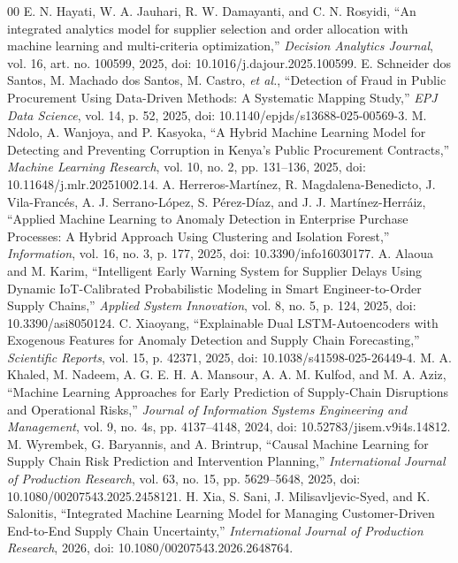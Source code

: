 \documentclass[conference]{IEEEtran}
\begin{document}
\begin{thebibliography}{00}
 E. N. Hayati, W. A. Jauhari, R. W. Damayanti, and C. N. Rosyidi, ``An integrated analytics model for supplier selection and order allocation with machine learning and multi-criteria optimization,'' \textit{Decision Analytics Journal}, vol. 16, art. no. 100599, 2025, doi: 10.1016/j.dajour.2025.100599.
 E. Schneider dos Santos, M. Machado dos Santos, M. Castro, \textit{et al.}, ``Detection of Fraud in Public Procurement Using Data-Driven Methods: A Systematic Mapping Study,'' \textit{EPJ Data Science}, vol. 14, p. 52, 2025, doi: 10.1140/epjds/s13688-025-00569-3.
 M. Ndolo, A. Wanjoya, and P. Kasyoka, ``A Hybrid Machine Learning Model for Detecting and Preventing Corruption in Kenya's Public Procurement Contracts,'' \textit{Machine Learning Research}, vol. 10, no. 2, pp. 131--136, 2025, doi: 10.11648/j.mlr.20251002.14.
 A. Herreros-Mart\'inez, R. Magdalena-Benedicto, J. Vila-Franc\'es, A. J. Serrano-L\'opez, S. P\'erez-D\'iaz, and J. J. Mart\'inez-Herr\'aiz, ``Applied Machine Learning to Anomaly Detection in Enterprise Purchase Processes: A Hybrid Approach Using Clustering and Isolation Forest,'' \textit{Information}, vol. 16, no. 3, p. 177, 2025, doi: 10.3390/info16030177.
 A. Alaoua and M. Karim, ``Intelligent Early Warning System for Supplier Delays Using Dynamic IoT-Calibrated Probabilistic Modeling in Smart Engineer-to-Order Supply Chains,'' \textit{Applied System Innovation}, vol. 8, no. 5, p. 124, 2025, doi: 10.3390/asi8050124.
 C. Xiaoyang, ``Explainable Dual LSTM-Autoencoders with Exogenous Features for Anomaly Detection and Supply Chain Forecasting,'' \textit{Scientific Reports}, vol. 15, p. 42371, 2025, doi: 10.1038/s41598-025-26449-4.
 M. A. Khaled, M. Nadeem, A. G. E. H. A. Mansour, A. A. M. Kulfod, and M. A. Aziz, ``Machine Learning Approaches for Early Prediction of Supply-Chain Disruptions and Operational Risks,'' \textit{Journal of Information Systems Engineering and Management}, vol. 9, no. 4s, pp. 4137--4148, 2024, doi: 10.52783/jisem.v9i4s.14812.
 M. Wyrembek, G. Baryannis, and A. Brintrup, ``Causal Machine Learning for Supply Chain Risk Prediction and Intervention Planning,'' \textit{International Journal of Production Research}, vol. 63, no. 15, pp. 5629--5648, 2025, doi: 10.1080/00207543.2025.2458121.
 H. Xia, S. Sani, J. Milisavljevic-Syed, and K. Salonitis, ``Integrated Machine Learning Model for Managing Customer-Driven End-to-End Supply Chain Uncertainty,'' \textit{International Journal of Production Research}, 2026, doi: 10.1080/00207543.2026.2648764.

\end{thebibliography}
\end{document}
